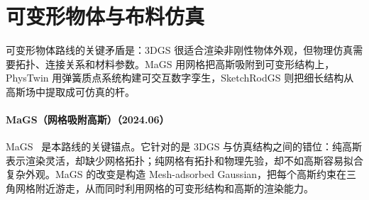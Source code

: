 \section{可变形物体与布料仿真}

可变形物体路线的关键矛盾是：3DGS 很适合渲染非刚性物体外观，但物理仿真需要拓扑、连接关系和材料参数。MaGS 用网格把高斯吸附到可变形结构上，PhysTwin 用弹簧质点系统构建可交互数字孪生，SketchRodGS 则把细长结构从高斯场中提取成可仿真的杆。
\paragraph{MaGS（网格吸附高斯）（2024.06）}
MaGS~\cite{2406_01593} 是本路线的关键锚点。它针对的是 3DGS 与仿真结构之间的错位：纯高斯表示渲染灵活，却缺少网格拓扑；纯网格有拓扑和物理先验，却不如高斯容易拟合复杂外观。MaGS 的改变是构造 Mesh-adsorbed Gaussian，把每个高斯约束在三角网格附近游走，从而同时利用网格的可变形结构和高斯的渲染能力。

